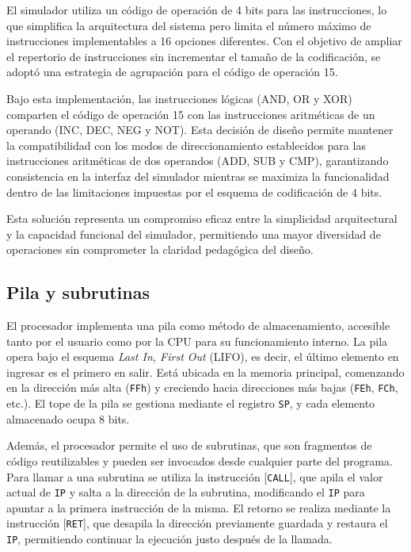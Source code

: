 \documentclass[12pt,oneside]{templates/unerthesis}
\begin{document}
El simulador utiliza un código de operación de 4 bits para las instrucciones, lo que simplifica la arquitectura del sistema pero limita el número máximo de instrucciones implementables a 16 opciones diferentes. Con el objetivo de ampliar el repertorio de instrucciones sin incrementar el tamaño de la codificación, se adoptó una estrategia de agrupación para el código de operación 15.

Bajo esta implementación, las instrucciones lógicas (AND, OR y XOR) comparten el código de operación 15 con las instrucciones aritméticas de un operando (INC, DEC, NEG y NOT). Esta decisión de diseño permite mantener la compatibilidad con los modos de direccionamiento establecidos para las instrucciones aritméticas de dos operandos (ADD, SUB y CMP), garantizando consistencia en la interfaz del simulador mientras se maximiza la funcionalidad dentro de las limitaciones impuestas por el esquema de codificación de 4 bits.

Esta solución representa un compromiso eficaz entre la simplicidad arquitectural y la capacidad funcional del simulador, permitiendo una mayor diversidad de operaciones sin comprometer la claridad pedagógica del diseño.

\hypertarget{pila-y-subrutinas}{%
\subsection{Pila y subrutinas}\label{pila-y-subrutinas}}

El procesador implementa una pila como método de almacenamiento, accesible tanto por el usuario como por la CPU para su funcionamiento interno. La pila opera bajo el esquema \emph{Last In, First Out} (LIFO), es decir, el último elemento en ingresar es el primero en salir. Está ubicada en la memoria principal, comenzando en la dirección más alta (\texttt{FFh}) y creciendo hacia direcciones más bajas (\texttt{FEh}, \texttt{FCh}, etc.). El tope de la pila se gestiona mediante el registro \texttt{SP}, y cada elemento almacenado ocupa 8 bits.

Además, el procesador permite el uso de subrutinas, que son fragmentos de código reutilizables y pueden ser invocados desde cualquier parte del programa. Para llamar a una subrutina se utiliza la instrucción {[}\texttt{CALL}{]}, que apila el valor actual de \texttt{IP} y salta a la dirección de la subrutina, modificando el \texttt{IP} para apuntar a la primera instrucción de la misma. El retorno se realiza mediante la instrucción {[}\texttt{RET}{]}, que desapila la dirección previamente guardada y restaura el \texttt{IP}, permitiendo continuar la ejecución justo después de la llamada.
\end{document}
